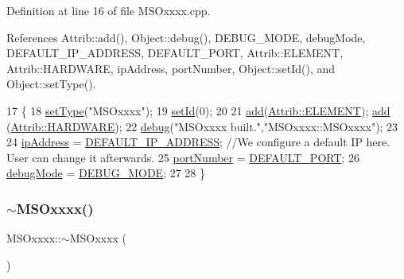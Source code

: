 Definition at line 16 of file M\+S\+Oxxxx.\+cpp.



References Attrib\+::add(), Object\+::debug(), D\+E\+B\+U\+G\+\_\+\+M\+O\+DE, debug\+Mode, D\+E\+F\+A\+U\+L\+T\+\_\+\+I\+P\+\_\+\+A\+D\+D\+R\+E\+SS, D\+E\+F\+A\+U\+L\+T\+\_\+\+P\+O\+RT, Attrib\+::\+E\+L\+E\+M\+E\+NT, Attrib\+::\+H\+A\+R\+D\+W\+A\+RE, ip\+Address, port\+Number, Object\+::set\+Id(), and Object\+::set\+Type().


\begin{DoxyCode}
17 \{
18     \hyperlink{classObject_aae534cc9d982bcb9b99fd505f2e103a5}{setType}(\textcolor{stringliteral}{"MSOxxxx"});
19     \hyperlink{classObject_a398fe08cba594a0ce6891d59fe4f159f}{setId}(0);
20 
21     \hyperlink{classAttrib_a235f773af19c900264a190b00a3b4ad7}{add}(\hyperlink{classAttrib_a69e171d7cc6417835a5a306d3c764235a7788bc5dd333fd8ce18562b269c9dab1}{Attrib::ELEMENT}); \hyperlink{classAttrib_a235f773af19c900264a190b00a3b4ad7}{add} (\hyperlink{classAttrib_a69e171d7cc6417835a5a306d3c764235a61ceb22149f365f1780d18f9d1459423}{Attrib::HARDWARE});
22     \hyperlink{classObject_aac010553f022165573714b7014a15f0d}{debug}(\textcolor{stringliteral}{"MSOxxxx built."},\textcolor{stringliteral}{"MSOxxxx::MSOxxxx"});
23 
24     \hyperlink{classMSOxxxx_aa55bdb0feb799b195628fe6ef0222b62}{ipAddress}  = \hyperlink{MSOxxxx_8h_a32de0e3cfb4b33d5da084bd19d16e11b}{DEFAULT\_IP\_ADDRESS};                                 \textcolor{comment}{//We
       configure a default IP here. User can change it afterwards.}
25     \hyperlink{classMSOxxxx_a242bcf72c701cd20d86d25315fc6180f}{portNumber}    =   \hyperlink{MSOxxxx_8h_a16b710f592bf8f7900666392adc444dc}{DEFAULT\_PORT};
26     \hyperlink{classMSOxxxx_a826ba82e93bbe5780169107a31dbfd29}{debugMode}      = \hyperlink{MSOxxxx_8h_ac80a3592e72fd96b772ee47a7d8e0d0a}{DEBUG\_MODE};
27 
28 \}
\end{DoxyCode}
\mbox{\label{classMSOxxxx_a567c156d78fbeab9d61bf8ec9acac851}} 
\subsubsection{\texorpdfstring{$\sim$\+M\+S\+Oxxxx()}{~MSOxxxx()}}
{\footnotesize\ttfamily M\+S\+Oxxxx\+::$\sim$\+M\+S\+Oxxxx (\begin{DoxyParamCaption}{ }\end{DoxyParamCaption})\hspace{0.3cm}{\ttfamily [inline]}}



